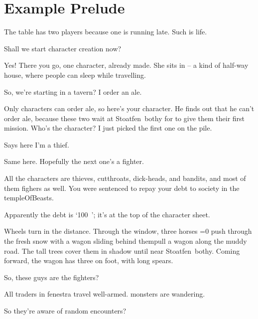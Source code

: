 \section{Example Prelude}

\begin{multicols}{2}

\noindent
The table has two players because one is running late.
Such is life.

\begin{description}\sf
  \item[Player 1:]
  Shall we start character creation now?
  \item[\Glsentrytext{gm}:]
  Yes!
  There you go, one character, already made.
  She sits in  -- a kind of half-way house, where people can sleep while travelling.
  \item[Player 2:]
  So, we're starting in a tavern?
  I order an ale.
  \item[\Glsentrytext{gm}:]
  Only characters can order ale, so here's your character.
  He finds out that he can't order ale, because these two wait at Stoatfen~\Gls{bothy} for  to give them their first mission.
  Who's the character?
  I just picked the first one on the pile.
  \item[Player 2:]
  Says here I'm a thief.
  \item[Player 1:]
  Same here.
  Hopefully the next one's a fighter.
  \item[\Glsentrytext{gm}:]
  All the characters are thieves, cutthroats, dick-heads, and bandits, and most of them fighers as well.
  You were sentenced to repay your debt to society in the \gls{templeOfBeasts}.
  \item[Player 1:]
  Apparently the debt is `100~'; it's at the top of the character sheet.
  \item[\Glsentrytext{gm}:]
  Wheels turn in the distance.
  Through the window, three horses \ifnum\value{temperature}=0 push through the fresh snow with a wagon sliding behind them\else pull a wagon along the muddy road\fi.
  The tall trees cover them in shadow until near Stoatfen~\Gls{bothy}.
  Coming forward, the wagon has three on foot, with long spears.
  \item[Player 1:]
  So, these guys are the fighters? 
  \item[\Glsentrytext{gm}:]
  All traders in \gls{fenestra} travel well-armed.
  \Glspl{monster} are wandering.
  \item[Player 1:]
  So they're aware of random encounters?

\end{description}
\end{multicols}
